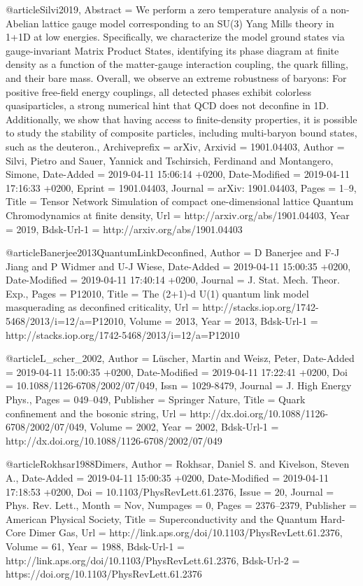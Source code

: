 \documentclass[epj,final]{svjour}
\begin{document}
{@article{Silvi2019,
	Abstract = {We perform a zero temperature analysis of a non-Abelian lattice gauge model corresponding to an SU(3) Yang Mills theory in 1+1D at low energies. Specifically, we characterize the model ground states via gauge-invariant Matrix Product States, identifying its phase diagram at finite density as a function of the matter-gauge interaction coupling, the quark filling, and their bare mass. Overall, we observe an extreme robustness of baryons: For positive free-field energy couplings, all detected phases exhibit colorless quasiparticles, a strong numerical hint that QCD does not deconfine in 1D. Additionally, we show that having access to finite-density properties, it is possible to study the stability of composite particles, including multi-baryon bound states, such as the deuteron.},
	Archiveprefix = {arXiv},
	Arxivid = {1901.04403},
	Author = {Silvi, Pietro and Sauer, Yannick and Tschirsich, Ferdinand and Montangero, Simone},
	Date-Added = {2019-04-11 15:06:14 +0200},
	Date-Modified = {2019-04-11 17:16:33 +0200},
	Eprint = {1901.04403},
	Journal = {arXiv: 1901.04403},
	Pages = {1--9},
	Title = {{Tensor Network Simulation of compact one-dimensional lattice Quantum Chromodynamics at finite density}},
	Url = {http://arxiv.org/abs/1901.04403},
	Year = {2019},
	Bdsk-Url-1 = {http://arxiv.org/abs/1901.04403}}

@article{Banerjee2013QuantumLinkDeconfined,
	Author = {D Banerjee and F-J Jiang and P Widmer and U-J Wiese},
	Date-Added = {2019-04-11 15:00:35 +0200},
	Date-Modified = {2019-04-11 17:40:14 +0200},
	Journal = {J. Stat. Mech. Theor. Exp.},
	Pages = {P12010},
	Title = {The (2+1)-d {U}(1) quantum link model masquerading as deconfined criticality},
	Url = {http://stacks.iop.org/1742-5468/2013/i=12/a=P12010},
	Volume = {2013},
	Year = {2013},
	Bdsk-Url-1 = {http://stacks.iop.org/1742-5468/2013/i=12/a=P12010}}

@article{L_scher_2002,
	Author = {L{\"u}scher, Martin and Weisz, Peter},
	Date-Added = {2019-04-11 15:00:35 +0200},
	Date-Modified = {2019-04-11 17:22:41 +0200},
	Doi = {10.1088/1126-6708/2002/07/049},
	Issn = {1029-8479},
	Journal = {J. High Energy Phys.},
	Pages = {049--049},
	Publisher = {Springer Nature},
	Title = {Quark confinement and the bosonic string},
	Url = {http://dx.doi.org/10.1088/1126-6708/2002/07/049},
	Volume = {2002},
	Year = {2002},
	Bdsk-Url-1 = {http://dx.doi.org/10.1088/1126-6708/2002/07/049}}

@article{Rokhsar1988Dimers,
	Author = {Rokhsar, Daniel S. and Kivelson, Steven A.},
	Date-Added = {2019-04-11 15:00:35 +0200},
	Date-Modified = {2019-04-11 17:18:53 +0200},
	Doi = {10.1103/PhysRevLett.61.2376},
	Issue = {20},
	Journal = {Phys. Rev. Lett.},
	Month = {Nov},
	Numpages = {0},
	Pages = {2376--2379},
	Publisher = {American Physical Society},
	Title = {Superconductivity and the Quantum Hard-Core Dimer Gas},
	Url = {http://link.aps.org/doi/10.1103/PhysRevLett.61.2376},
	Volume = {61},
	Year = {1988},
	Bdsk-Url-1 = {http://link.aps.org/doi/10.1103/PhysRevLett.61.2376},
	Bdsk-Url-2 = {https://doi.org/10.1103/PhysRevLett.61.2376}}

}
\end{document}
